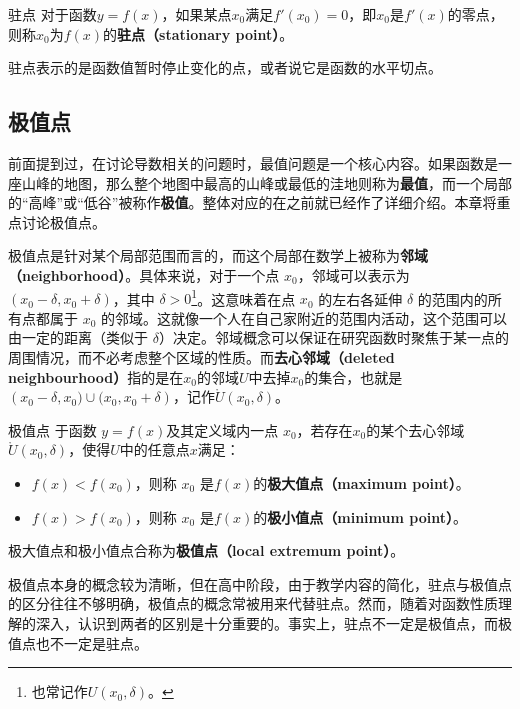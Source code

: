 \begin{definition}{驻点}
对于函数$y=f(x)$，如果某点$x_0$满足$f'(x_0)=0$，即$x_0$是$f'(x)$的零点，则称$x_0$为$f(x)$的\textbf{驻点（stationary point）}。
\end{definition}

驻点表示的是函数值暂时停止变化的点，或者说它是函数的水平切点。

\subsection{极值点}

前面提到过，在讨论导数相关的问题时，最值问题是一个核心内容。如果函数是一座山峰的地图，那么整个地图中最高的山峰或最低的洼地则称为\textbf{最值}，而一个局部的“高峰”或“低谷”被称作\textbf{极值}。整体对应的在之前就已经作了详细介绍。本章将重点讨论极值点。

极值点是针对某个局部范围而言的，而这个局部在数学上被称为\textbf{邻域（neighborhood）}。具体来说，对于一个点 $x_0$，邻域可以表示为 $\left( x_0 - \delta, x_0 + \delta \right)$，其中 $\delta > 0$\footnote{也常记作${U}(x_0, \delta)$。}。这意味着在点 $x_0$ 的左右各延伸 $\delta$ 的范围内的所有点都属于 $x_0$ 的邻域。这就像一个人在自己家附近的范围内活动，这个范围可以由一定的距离（类似于 $\delta$）决定。邻域概念可以保证在研究函数时聚焦于某一点的周围情况，而不必考虑整个区域的性质。而\textbf{去心邻域（deleted neighbourhood）}指的是在$x_0$的邻域$U$中去掉$x_0$的集合，也就是$\left( x_0 - \delta,x_0)\cup(x_0, x_0 + \delta \right)$，记作$\mathring{U}(x_0,\delta)$。

\begin{definition}{极值点}
于函数 $y=f(x)$及其定义域内一点 $x_0$，若存在$x_0$的某个去心邻域$\mathring{U}(x_0,\delta)$，使得$U$中的任意点$x$满足：
\begin{itemize}
\item $f(x) < f\left(x_0\right)$，则称 $x_0$ 是$f(x)$的\textbf{极大值点（maximum point）}。
\item $f(x) > f\left(x_0\right)$，则称 $x_0$ 是$f(x)$的\textbf{极小值点（minimum point）}。
\end{itemize}
极大值点和极小值点合称为\textbf{极值点（local extremum point）}。
\end{definition}

极值点本身的概念较为清晰，但在高中阶段，由于教学内容的简化，驻点与极值点的区分往往不够明确，极值点的概念常被用来代替驻点。然而，随着对函数性质理解的深入，认识到两者的区别是十分重要的。事实上，驻点不一定是极值点，而极值点也不一定是驻点。

